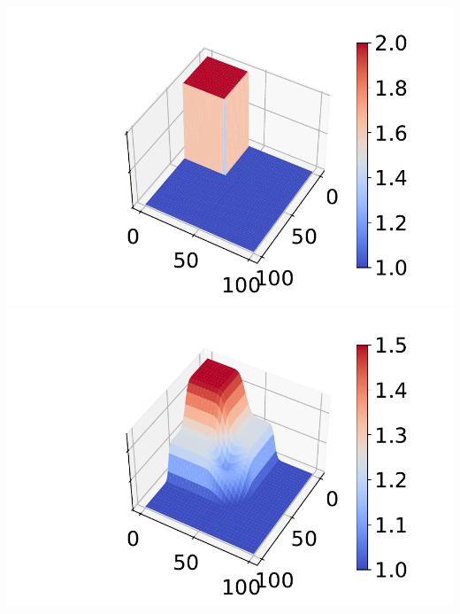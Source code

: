 \documentclass[
11pt, %
francais, %
singlespacing, %
headsepline, %
f%
]{MastersDoctoralThesis} %
\theoremstyle{definition}
\begin{document}
\begin{center}
\includegraphics[scale = 0.6]{barrage2D0}
\includegraphics[scale = 0.6]{barrage2D1} 
\end{center}
\end{document}
